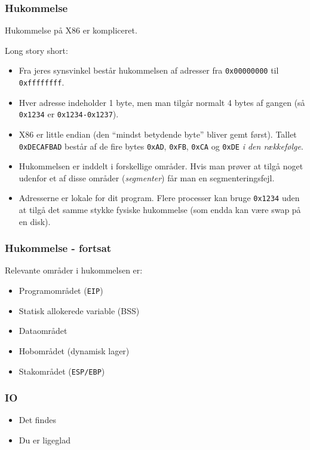 \documentclass[slidestop,compress,mathserif, xcolor=table]{beamer}
\begin{document}
\begin{frame}[c]
    \frametitle{Hukommelse}
    \pause Hukommelse på X86 er kompliceret.\vskip10pt

    \pause Long story short:
    \begin{itemize}

      \pause
    \item Fra jeres synsvinkel består hukommelsen af adresser fra
      \texttt{0x00000000} til \texttt{0xffffffff}.

      \pause
    \item Hver adresse indeholder 1 byte, men man tilgår normalt 4 bytes af
      gangen (så \texttt{0x1234} er \texttt{0x1234-0x1237}).

      \pause
    \item X86 er little endian (den ``mindst betydende byte'' bliver gemt
      først).  Tallet \texttt{0xDECAFBAD} består af de fire bytes \texttt{0xAD},
      \texttt{0xFB}, \texttt{0xCA} og \texttt{0xDE} \textit{i den rækkefølge}.

      \pause
    \item Hukommelsen er inddelt i forskellige områder. Hvis man prøver at tilgå
      noget udenfor et af disse områder (\textit{segmenter}) får man en
      segmenteringsfejl.

      \pause
    \item Adresserne er lokale for dit program. Flere processer kan bruge
      \texttt{0x1234} uden at tilgå det samme stykke fysiske hukommelse (som
      endda kan være swap på en disk).
    \end{itemize}
\end{frame}

\begin{frame}[c]
    \frametitle{Hukommelse - fortsat}

    Relevante områder i hukommelsen er:
    \begin{itemize}
        \pause\item Programområdet (\texttt{EIP})
        \pause\item Statisk allokerede variable (BSS)
        \pause\item Dataområdet
        \pause\item Hobområdet (dynamisk lager)
        \pause\item Stakområdet (\texttt{ESP/EBP})
    \end{itemize}
\end{frame}

\begin{frame}[c]
    \frametitle{IO}

    \begin{itemize}
        \pause\item Det findes
        \pause\item Du er ligeglad
    \end{itemize}
\end{frame}
\end{document}
